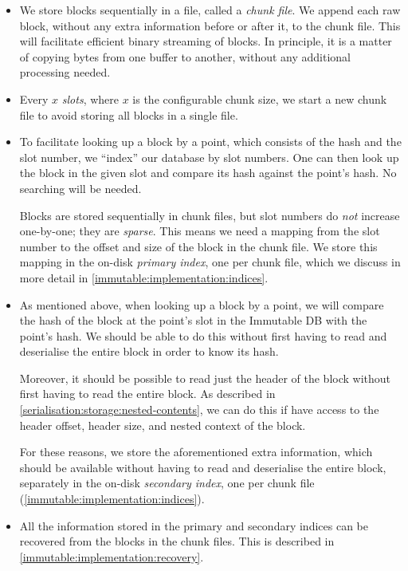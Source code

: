 \begin{itemize}
\item We store blocks sequentially in a file, called a \emph{chunk file}. We
  append each raw block, without any extra information before or after it, to
  the chunk file. This will facilitate efficient binary streaming of blocks. In
  principle, it is a matter of copying bytes from one buffer to another, without
  any additional processing needed.

\item Every $x$ \emph{slots}, where $x$ is the configurable chunk size, we start
  a new chunk file to avoid storing all blocks in a single file.

\item To facilitate looking up a block by a point, which consists of the hash
  and the slot number, we ``index'' our database by slot numbers. One can then
  look up the block in the given slot and compare its hash against the point's
  hash. No searching will be needed.

  Blocks are stored sequentially in chunk files, but slot numbers do \emph{not}
  increase one-by-one; they are \emph{sparse}. This means we need a mapping from
  the slot number to the offset and size of the block in the chunk file. We
  store this mapping in the on-disk \emph{primary index}, one per chunk file,
  which we discuss in more detail in \cref{immutable:implementation:indices}.

\item As mentioned above, when looking up a block by a point, we will compare
  the hash of the block at the point's slot in the Immutable DB with the point's
  hash. We should be able to do this without first having to read and
  deserialise the entire block in order to know its hash.

  Moreover, it should be possible to read just the header of the block without
  first having to read the entire block. As described in
  \cref{serialisation:storage:nested-contents}, we can do this if have access to
  the header offset, header size, and nested context of the block.

  For these reasons, we store the aforementioned extra information, which should
  be available without having to read and deserialise the entire block,
  separately in the on-disk \emph{secondary index}, one per chunk file
  (\cref{immutable:implementation:indices}).

\item All the information stored in the primary and secondary indices can be
  recovered from the blocks in the chunk files. This is described in
  \cref{immutable:implementation:recovery}.


\end{itemize}
